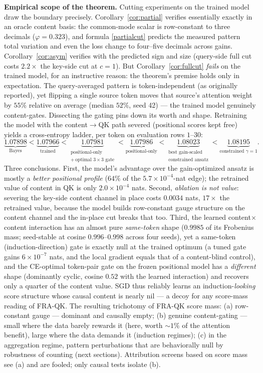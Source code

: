 \documentclass{article}
\theoremstyle{definition}
\begin{document}
\textbf{Empirical scope of the theorem.} Cutting experiments on the trained
model draw the boundary precisely. Corollary~\ref{cor:partial} verifies
essentially exactly in an oracle content basis: the common-mode scalar is
row-constant to three decimals ($\varphi = 0.323$), and formula
\eqref{partialcut} predicts the measured pattern total variation and even
the loss change to four--five decimals across gains.
Corollary~\ref{cor:asym} verifies with the predicted sign and size
(query-side full cut costs $2.2\times$ the key-side cut at $c=1$). But
Corollary~\ref{cor:fullcut} \emph{fails} on the trained model, for an
instructive reason: the theorem's premise holds only in expectation. The
query-averaged pattern is token-independent (as originally reported), yet
flipping a single source token moves that source's attention weight by
$55\%$ relative on average (median $52\%$, seed 42) --- the trained model
genuinely content-gates. Dissecting
the gating pins down its worth and shape. Retraining the model with the
content$\to$QK path severed (positional scores kept free) yields a
cross-entropy ladder, per token on evaluation rows $1$--$30$:
\[
\underbrace{1.07898}_{\text{Bayes}} <
\underbrace{1.07966}_{\text{trained}} <
\underbrace{1.07981}_{\substack{\text{positional-only}\\ +\,\text{optimal }3\times3\text{ gate}}} <
\underbrace{1.07986}_{\text{positional-only}} <
\underbrace{1.08023}_{\substack{\text{best gain-scaled}\\ \text{constrained ansatz}}} <
\underbrace{1.08195}_{\text{constrained }\gamma=1}.
\]
Three conclusions. First, the model's advantage over the gain-optimized
ansatz is mostly a \emph{better positional profile} ($64\%$ of the
$5.7\times10^{-4}$-nat edge); the retrained value of content in QK is only
$2.0\times10^{-4}$ nats. Second, \emph{ablation is not value}: severing the
key-side content channel in place costs $0.0034$ nats, $17\times$ the
retrained value, because the model builds row-constant gauge structure on
the content channel and the in-place cut breaks that too. Third, the
learned content$\times$content interaction has an almost pure
\emph{same-token} shape ($0.9985$ of its Frobenius mass; seed-stable at
cosine $0.996$--$0.998$ across four seeds), yet a same-token
(induction-direction) gate is exactly null at the trained optimum (a tuned
gate gains $6\times10^{-7}$ nats, and the local gradient equals that of a
content-blind control), and the CE-optimal token-pair gate on the frozen
positional model has a \emph{different} shape (dominantly cyclic, cosine
$0.52$ with the learned interaction) and recovers only a quarter of the
content value. SGD thus reliably learns an induction-\emph{looking} score
structure whose causal content is nearly nil --- a decoy for any
score-mass reading of FRA-QK. The resulting trichotomy of FRA-QK score
mass: (a) row-constant gauge --- dominant and causally empty; (b) genuine
content-gating --- small where the data barely rewards it (here, worth
$\sim 1\%$ of the attention benefit), large where the data demands it
(induction regimes); (c) in the aggregation regime, pattern perturbations
that are behaviorally null by robustness of counting (next sections).
Attribution screens based on score mass see (a) and are fooled; only causal
tests isolate (b).
\end{document}

